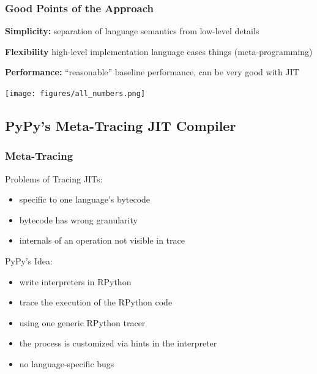 \documentclass[utf8x]{beamer}
\begin{document}
\begin{frame}
  \frametitle{Good Points of the Approach}
  {\bf Simplicity:} separation of language semantics from low-level details
  \pause

  {\bf Flexibility} high-level implementation language eases things (meta-programming)
  \pause

  {\bf Performance:} ``reasonable'' baseline performance, can be very good with JIT
\end{frame}


\begin{frame}[plain]
  \texttt{[image: figures/all\_numbers.png]}
\end{frame}

\subsection{PyPy's Meta-Tracing JIT Compiler}

%

\begin{frame}
  \frametitle{Meta-Tracing}
  Problems of Tracing JITs:
  \begin{itemize}
      \item specific to one language's bytecode
      \item bytecode has wrong granularity
      \item internals of an operation not visible in trace
  \end{itemize}
  \pause
  \begin{block}{PyPy's Idea:}
      \begin{itemize}
          \item write interpreters in RPython
          \item trace the execution of the RPython code
          \item using one generic RPython tracer
          \item the process is customized via hints in the interpreter
          \item no language-specific bugs
      \end{itemize}
  \end{block}
\end{frame}
\end{document}
